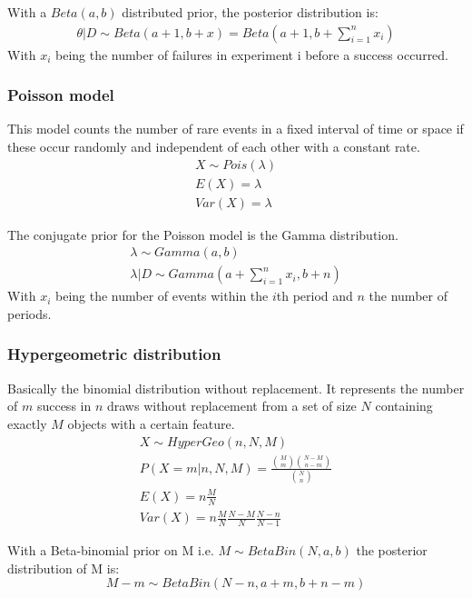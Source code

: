 With a $Beta(a,b)$ distributed prior, the posterior distribution is:
\begin{gather*}
\theta|D\sim Beta(a+1, b+x) = Beta(a+1, b+\sum_{i=1}^{n}x_i)
\end{gather*}
With $x_i$ being the number of failures in experiment i before a success occurred.

\subsubsection{Poisson model}
This model counts the number of rare events in a fixed interval of time or space if these occur randomly and independent of each other with a constant rate.
\begin{gather*}
X\sim Pois(\lambda)\\
E(X) = \lambda\\
Var(X) = \lambda
\end{gather*}

The conjugate prior for the Poisson model is the Gamma distribution.
\begin{gather*}
\lambda \sim Gamma(a, b)\\
\lambda|D \sim Gamma(a+\sum_{i=1}^{n}x_i, b+n)
\end{gather*}
With $x_i$ being the number of events within the $i$th period and $n$ the number of periods.

\subsubsection{Hypergeometric distribution}
Basically the binomial distribution without replacement. It represents the number of $m$ success in $n$ draws without replacement from a set of size $N$ containing exactly $M$ objects with a certain feature.
\begin{gather*}
X\sim HyperGeo(n,N,M)\\
P(X=m|n, N, M) = \frac{{{M}\choose{m}}{{N-M}\choose{n-m}}}{{N\choose n}}\\
E(X) = n\frac{M}{N}\\
Var(X) = n\frac{M}{N}\frac{N-M}{N}\frac{N-n}{N-1}
\end{gather*}

With a Beta-binomial prior on M i.e. $M\sim BetaBin(N, a, b)$ the posterior distribution of M is:
\begin{equation*}
M-m\sim BetaBin(N-n, a+m, b+n-m)
\end{equation*}